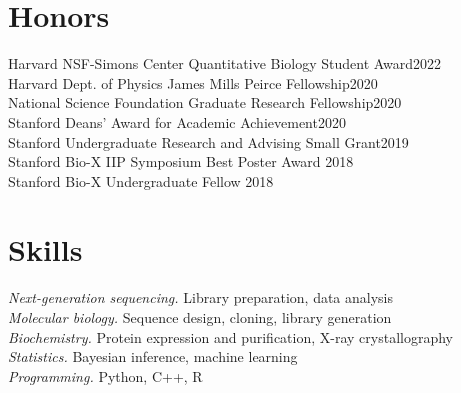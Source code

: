 \documentclass[margin,11pt]{res}
\newenvironment{myitemize}
{ \vspace{-1.5\topsep} \begin{itemize} \setlength\itemsep{0em}}
{ \end{itemize} \vspace{-0.5\topsep}}
\begin{document}
\begin{resume}


\section{Honors}
 
Harvard NSF-Simons Center Quantitative Biology Student Award\hfill 2022 \\
Harvard Dept. of Physics James Mills Peirce Fellowship\hfill 2020 \\
National Science Foundation Graduate Research Fellowship\hfill 2020 \\
Stanford Deans' Award for Academic Achievement\hfill 2020 \\
Stanford Undergraduate Research and Advising Small Grant\hfill 2019 \\
Stanford Bio-X IIP Symposium Best Poster Award \hfill 2018 \\
Stanford Bio-X Undergraduate Fellow \hfill 2018

\section{Skills}

\textit{Next-generation sequencing.} Library preparation, data analysis \\
\textit{Molecular biology.} Sequence design, cloning, library generation \\
\textit{Biochemistry.} Protein expression and purification, X-ray crystallography \\
\textit{Statistics.} Bayesian inference, machine learning \\
\textit{Programming.} Python, C++, R


\end{resume}
\end{document}
